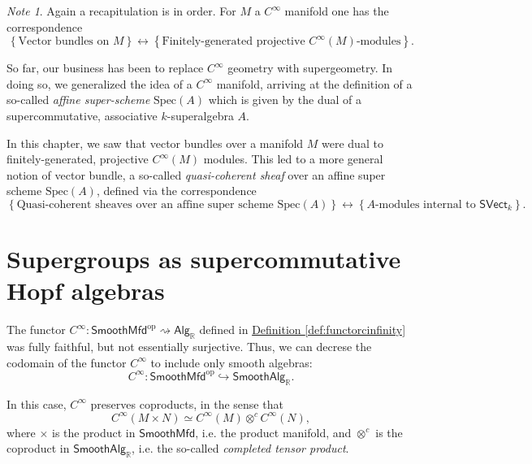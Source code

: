 \documentclass[a4paper,10pt]{scrreprt}
\newcommand{\R}{\mathbb{R}}
\newcommand{\Spec}{\mathrm{Spec}}
\theoremstyle{definition}
\theoremstyle{plain}
\theoremstyle{remark}
\newtheorem{note}{Note}[section]
\begin{document}
\begin{note}
  Again a recapitulation is in order. For $M$ a $C^{\infty}$ manifold one has the correspondence
  \begin{equation*}
    \left\{ \text{Vector bundles on $M$} \right\} \longleftrightarrow \left\{ \text{Finitely-generated projective $C^{\infty}(M)$-modules} \right\}.
  \end{equation*}

  So far, our business has been to replace $C^{\infty}$ geometry with supergeometry. In doing so, we generalized the idea of a $C^{\infty}$ manifold, arriving at the definition of a so-called \emph{affine super-scheme} $\Spec(A)$ which is given by the dual of a supercommutative, associative $k$-superalgebra $A$.

  In this chapter, we saw that vector bundles over a manifold $M$ were dual to finitely-generated, projective $C^{\infty}(M)$ modules. This led to a more general notion of vector bundle, a so-called \emph{quasi-coherent sheaf} over an affine super scheme $\Spec(A)$, defined via the correspondence
  \begin{equation*}
    \left\{ \text{Quasi-coherent sheaves over an affine super scheme $\Spec(A)$} \right\} \longleftrightarrow \left\{ \text{$A$-modules internal to $\mathsf{SVect}_{k}$} \right\}.
  \end{equation*}
\end{note}

\section{Supergroups as supercommutative Hopf algebras}

The functor $C^{\infty}\colon \mathsf{SmoothMfd}^{\mathrm{op}} \rightsquigarrow \mathsf{Alg}_{\R}$ defined in \hyperref[def:functorcinfinity]{Definition \ref*{def:functorcinfinity}} was fully faithful, but not essentially surjective. Thus, we can decrese the codomain of the functor $C^{\infty}$ to include only smooth algebras:
\begin{equation*}
  C^{\infty}\colon \mathsf{SmoothMfd}^{\mathrm{op}} \hookrightarrow \mathsf{SmoothAlg}_{\R}.
\end{equation*}

In this case, $C^{\infty}$ preserves coproducts, in the sense that
\begin{equation*}
  C^{\infty}(M \times N) \simeq C^{\infty}(M) \otimes^{c} C^{\infty}(N),
\end{equation*}
where $\times$ is the product in $\mathsf{SmoothMfd}$, i.e. the product manifold, and $\otimes^{c}$ is the coproduct in $\mathsf{SmoothAlg}_{\R}$, i.e. the so-called \emph{completed tensor product}.
\end{document}
